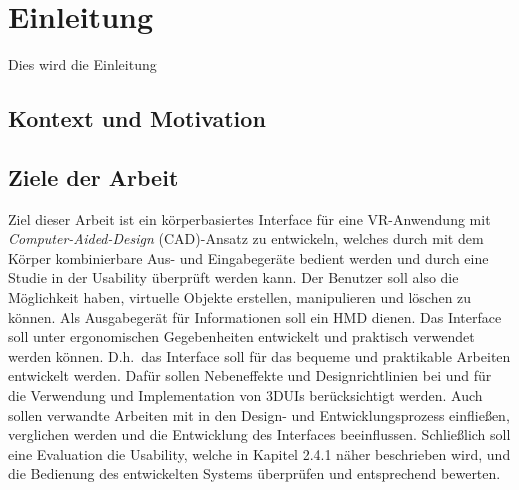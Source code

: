 \section{Einleitung}
Dies wird die Einleitung

\subsection{Kontext und Motivation}

\subsection{Ziele der Arbeit}
Ziel dieser Arbeit ist ein körperbasiertes Interface für eine VR-Anwendung mit \textit{Computer-Aided-Design} (CAD)-Ansatz zu entwickeln, welches durch mit dem Körper kombinierbare Aus- und Eingabegeräte bedient werden und durch eine Studie in der Usability überprüft werden kann. Der Benutzer soll also die Möglichkeit haben, virtuelle Objekte erstellen, manipulieren und löschen zu können. Als Ausgabegerät für Informationen  soll ein HMD dienen. Das Interface soll unter ergonomischen Gegebenheiten entwickelt und praktisch verwendet werden können. D.h.~das Interface soll für das bequeme und praktikable Arbeiten entwickelt werden. Dafür sollen Nebeneffekte und Designrichtlinien bei und für die Verwendung und Implementation von 3DUIs berücksichtigt werden. Auch sollen verwandte Arbeiten mit in den Design- und Entwicklungsprozess einfließen, verglichen werden und die Entwicklung des Interfaces beeinflussen. Schließlich soll eine Evaluation die Usability, welche in Kapitel 2.4.1 näher beschrieben wird, und die Bedienung des entwickelten Systems überprüfen und entsprechend bewerten.